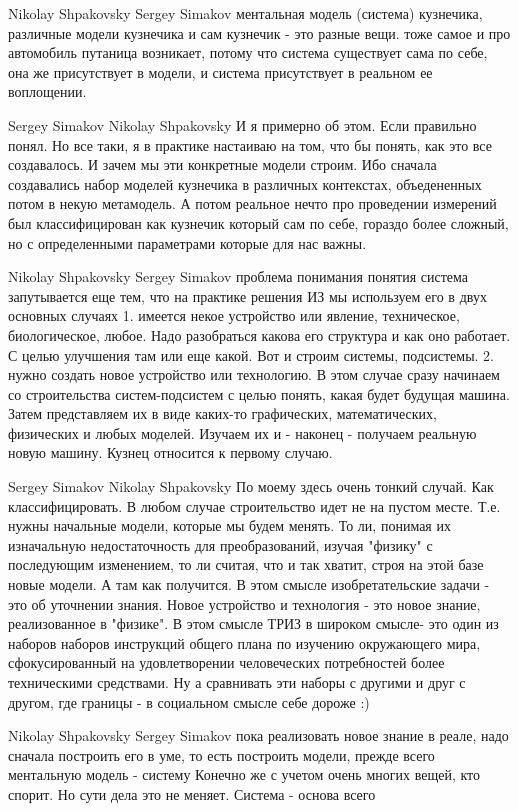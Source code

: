 \documentclass[11pt,a4paper]{article}
\begin{document}
Nikolay Shpakovsky Sergey Simakov ментальная модель (система) кузнечика,
различные модели кузнечика и сам кузнечик - это разные вещи.  тоже самое и про
автомобиль путаница возникает, потому что система существует сама по себе, она
же присутствует в модели, и система присутствует в реальном ее воплощении.

Sergey Simakov Nikolay Shpakovsky И я примерно об этом. Если правильно понял.
Но все таки, я в практике настаиваю на том, что бы понять, как это все
создавалось. И зачем мы эти конкретные модели строим.  Ибо сначала создавались
набор моделей кузнечика в различных контекстах, объедененных потом в некую
метамодель. А потом реальное нечто про проведении измерений был
классифицирован как кузнечик который сам по себе, гораздо более сложный, но с
определенными параметрами которые для нас важны.

Nikolay Shpakovsky Sergey Simakov проблема понимания понятия система
запутывается еще тем, что на практике решения ИЗ мы используем его в двух
основных случаях 1. имеется некое устройство или явление, техническое,
биологическое, любое. Надо разобраться какова его структура и как оно
работает. С целью улучшения там или еще какой. Вот и строим системы,
подсистемы.  2. нужно создать новое устройство или технологию. В этом случае
сразу начинаем со строительства систем-подсистем с целью понять, какая будет
будущая машина. Затем представляем их в виде каких-то графических,
математических, физических и любых моделей. Изучаем их и - наконец - получаем
реальную новую машину.  Кузнец относится к первому случаю.

Sergey Simakov Nikolay Shpakovsky По моему здесь очень тонкий случай. Как
классифицировать. В любом случае строительство идет не на пустом
месте. Т.е. нужны начальные модели, которые мы будем менять. То ли, понимая их
изначальную недостаточность для преобразований, изучая "физику" с последующим
изменением, то ли считая, что и так хватит, строя на этой базе новые модели. А
там как получится.  В этом смысле изобретательские задачи - это об уточнении
знания. Новое устройство и технология - это новое знание, реализованное в
"физике".  В этом смысле ТРИЗ в широком смысле- это один из наборов наборов
инструкций общего плана по изучению окружающего мира, сфокусированный на
удовлетворении человеческих потребностей более техническими средствами.  Ну а
сравнивать эти наборы с другими и друг с другом, где границы - в социальном
смысле себе дороже :)

Nikolay Shpakovsky Sergey Simakov пока реализовать новое знание в реале, надо
сначала построить его в уме, то есть построить модели, прежде всего ментальную
модель - систему Конечно же с учетом очень многих вещей, кто спорит. Но сути
дела это не меняет. Система - основа всего
\end{document}
